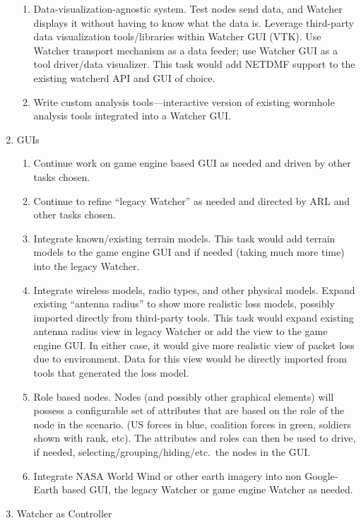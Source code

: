 \documentclass{report}
\begin{document}
\begin{enumerate}
\begin{enumerate}
        \item Data-visualization-agnostic system. Test nodes send data, and Watcher displays it without having to know what the data is. Leverage third-party data visualization tools\slash libraries within Watcher GUI (VTK). Use Watcher transport mechanism as a data feeder; use Watcher GUI as a tool driver\slash data visualizer. This task would add NETDMF support to the existing watcherd API and GUI of choice. 
        \item Write custom analysis tools---interactive version of existing wormhole analysis tools integrated into a Watcher GUI.
\end{enumerate}
\item GUIs 
\begin{enumerate}
    \item Continue work on game engine based GUI as needed and driven by other tasks chosen. 
    \item Continue to refine ``legacy Watcher'' as needed and directed by ARL and other tasks chosen.
    \item Integrate known\slash existing terrain models. This task would add terrain models to the game engine GUI and if needed (taking much more time) into the legacy Watcher.
    \item Integrate wireless models, radio types, and other physical models. Expand existing ``antenna radius'' to show more realistic loss models, possibly imported directly from third-party tools. This task would expand existing antenna radius view in legacy Watcher or add the view to the game engine GUI. In either case, it would give more realistic view of packet loss due to environment. Data for this view would be directly imported from tools that generated the loss model. 
    \item Role based nodes. Nodes (and possibly other graphical elements) will possess a configurable set of attributes that are based on the role of the node in the scenario. (US forces in blue, coalition forces in green, soldiers shown with rank, etc). The attributes and roles can then be used to drive, if needed, selecting\slash grouping\slash hiding\slash etc.\ the nodes in the GUI.   
    \item Integrate NASA World Wind or other earth imagery into non Google-Earth based GUI, the legacy Watcher or game engine Watcher as needed. 
\end{enumerate}
\item Watcher as Controller 
\begin{enumerate}

\end{enumerate}
\end{enumerate}
\end{document}
